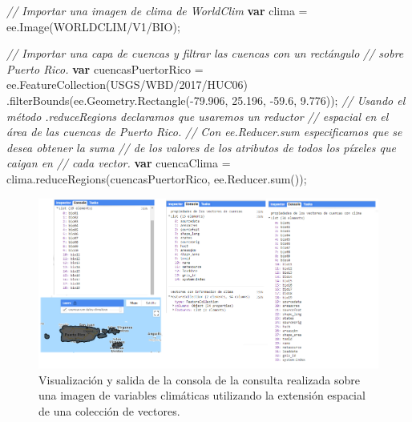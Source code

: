 \documentclass[
  12pt,
  letterpaper,
  twoside]{book}
\newenvironment{Shaded}{\begin{snugshade}}{\end{snugshade}}
\newcommand{\AttributeTok}[1]{\textcolor[rgb]{0.48,0.12,0.64}{#1}}
\newcommand{\CommentTok}[1]{\textcolor[rgb]{0.24,0.58,0.00}{\textit{#1}}}
\newcommand{\FloatTok}[1]{\textcolor[rgb]{0.28,0.53,0.93}{#1}}
\newcommand{\FunctionTok}[1]{\textcolor[rgb]{0.48,0.12,0.64}{#1}}
\newcommand{\KeywordTok}[1]{\textcolor[rgb]{0.00,0.00,0.00}{\textbf{#1}}}
\newcommand{\NormalTok}[1]{#1}
\newcommand{\OperatorTok}[1]{\textcolor[rgb]{0.00,0.00,0.00}{#1}}
\newcommand{\StringTok}[1]{\textcolor[rgb]{0.87,0.29,0.22}{#1}}
\begin{document}
\begin{Shaded}
\begin{Highlighting}[]
\CommentTok{// Importar una imagen de clima de WorldClim}
\KeywordTok{var}\NormalTok{ clima }\OperatorTok{=}\NormalTok{ ee}\OperatorTok{.}\FunctionTok{Image}\NormalTok{(}\StringTok{\textquotesingle{}WORLDCLIM/V1/BIO\textquotesingle{}}\NormalTok{)}\OperatorTok{;}

\CommentTok{// Importar una capa de cuencas y filtrar las cuencas con un rectángulo }
\CommentTok{// sobre Puerto Rico.}
\KeywordTok{var}\NormalTok{ cuencasPuertorRico }\OperatorTok{=}\NormalTok{ ee}\OperatorTok{.}\FunctionTok{FeatureCollection}\NormalTok{(}\StringTok{\textquotesingle{}USGS/WBD/2017/HUC06\textquotesingle{}}\NormalTok{)}
  \OperatorTok{.}\FunctionTok{filterBounds}\NormalTok{(ee}\OperatorTok{.}\AttributeTok{Geometry}\OperatorTok{.}\FunctionTok{Rectangle}\NormalTok{(}\OperatorTok{{-}}\FloatTok{79.906}\OperatorTok{,} \FloatTok{25.196}\OperatorTok{,} \OperatorTok{{-}}\FloatTok{59.6}\OperatorTok{,} \FloatTok{9.776}\NormalTok{))}\OperatorTok{;}
\CommentTok{// Usando el método .reduceRegions declaramos que usaremos un reductor }
\CommentTok{// espacial en el área de las cuencas de Puerto Rico.}
\CommentTok{// Con ee.Reducer.sum especificamos que se desea obtener la suma}
\CommentTok{// de los valores de los atributos de todos los píxeles que caigan en }
\CommentTok{// cada vector.}
\KeywordTok{var}\NormalTok{ cuencaClima }\OperatorTok{=}\NormalTok{ clima}\OperatorTok{.}\FunctionTok{reduceRegions}\NormalTok{(cuencasPuertorRico}\OperatorTok{,}\NormalTok{ ee}\OperatorTok{.}\AttributeTok{Reducer}\OperatorTok{.}\FunctionTok{sum}\NormalTok{())}\OperatorTok{;}
\end{Highlighting}
\end{Shaded}

\begin{figure}[H]

{\centering \includegraphics[width=0.95\linewidth]{Img/ej23} 

}

\caption{Visualización y salida de la consola de la consulta realizada sobre una imagen de variables climáticas utilizando la extensión espacial de una colección de vectores.}\label{fig:f811}
\end{figure}
\end{document}
